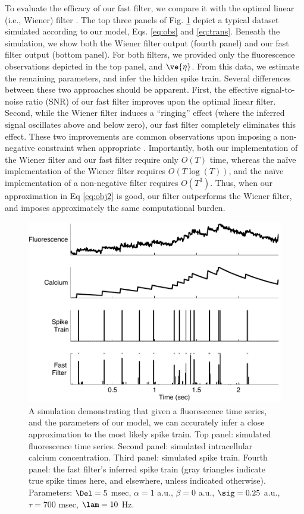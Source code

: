 To evaluate the efficacy of our fast filter, we compare it with the optimal linear (i.e., Wiener) filter \cite{Wiener49}. The top three panels of Fig. \ref{fig:schem} depict a typical dataset simulated according to our model, Eqs. \eqref{eq:obs} and \eqref{eq:trans}. Beneath the simulation, we show both the Wiener filter output (fourth panel) and our fast filter output (bottom panel).  For both filters, we provided only the fluorescence observations depicted in the top panel, and $\ve{\eta}$.  From this data, we estimate the remaining parameters, and infer the hidden spike train. Several differences between these two approaches should be apparent.  First, the effective signal-to-noise ratio (SNR) of our fast filter improves upon the optimal linear filter.  Second, while the Wiener filter induces a ``ringing'' effect (where the inferred signal oscillates above and below zero), our fast filter completely eliminates this effect.  These two improvements are common observations upon imposing a non-negative constraint when appropriate \cite{ShumwayStoffer06}.  Importantly, both our implementation of the Wiener filter and our fast filter require only $O(T)$ time, whereas the na\"{i}ve implementation of the Wiener filter requires $O(T \log(T))$, and the na\"{i}ve implementation of a non-negative filter requires $O(T^3)$.  Thus, when our approximation in Eq \eqref{eq:obj2} is good, our filter outperforms the Wiener filter, and imposes approximately the same computational burden.

\begin{figure}[H]
\centering \includegraphics[width=.9\linewidth]{../figs/schem}
\caption{A simulation demonstrating that given a fluorescence time series, and the parameters of our model, we can accurately infer a close approximation to the most likely spike train.  Top panel: simulated fluorescence time series.  Second panel: simulated intracellular calcium concentration.  Third panel: simulated spike train. Fourth panel: the fast filter's inferred spike train (gray triangles indicate true spike times here, and elsewhere, unless indicated otherwise).  Parameters: $\Del=5$ msec, $\alpha=1$ a.u., $\beta=0$ a.u., $\sig=0.25$ a.u., $\tau=700$ msec, $\lam=10$ Hz.} \label{fig:schem}
\end{figure}

